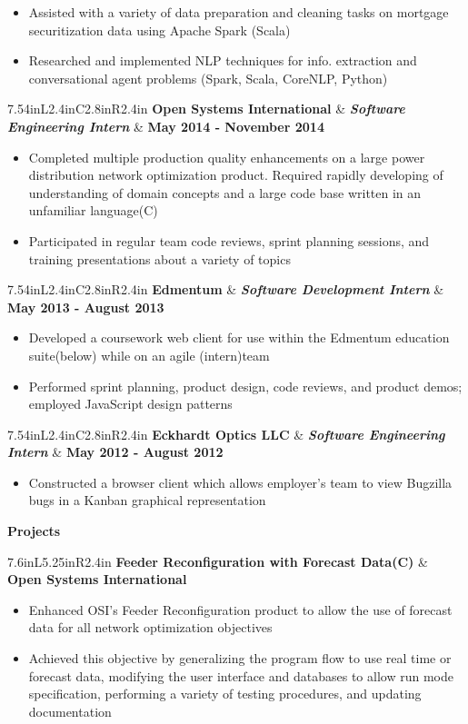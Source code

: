 \documentclass[letterpaper,10pt]{article}
\newcommand{\resitem}[1]{\item #1 

\vspace{-.1in}
}
\newcommand{\resheading}[1]{
	{
		\large\colorbox{mygrey}
		{
			\begin{minipage}{.98\textwidth}

			\centerline{\textbf{#1 \vphantom{p\^{E}}}}
			\end{minipage}
		}
	}
}
\newcommand{\ressubheadingg}[2]{
	\begin{tabular*}{7.6in}{L{5.25in}R{2.4in}}
			\textbf{#1} & \textbf{#2}
	\end{tabular*}
}
\newcommand{\rressubheading}[3]{
	\begin{tabular*}{7.54in}{L{2.4in}C{2.8in}R{2.4in}}
			\textbf{#1} & \textit{\textbf{#2}}  & \textbf{#3}
	\end{tabular*}
}
\begin{document}
			\vspace{-.1in}
			\begin{itemize}
				\resitem{Assisted with a variety of data preparation and cleaning tasks on mortgage securitization data using Apache Spark (Scala)}
				\resitem{Researched and implemented NLP techniques for info. extraction and conversational agent problems (Spark, Scala, CoreNLP, Python)}
			\end{itemize}
			\vspace{.1in}
		\rressubheading{Open Systems International}{Software Engineering Intern}{May 2014 - November 2014}
			\vspace{-.1in}
			\begin{itemize}
				\resitem{Completed multiple production quality enhancements on a large power distribution network optimization product. Required rapidly developing of understanding of domain concepts and a large code base written in an unfamiliar language(C)}
				\resitem{Participated in regular team code reviews, sprint planning sessions, and training presentations about a variety of topics}
			\end{itemize}
			\vspace{.1in}
		\rressubheading{Edmentum}{Software Development Intern}{May 2013 - August 2013}
			\vspace{-.1in}
			\begin{itemize}
				\resitem{Developed a coursework web client for use within the Edmentum education suite(below) while on an agile (intern)team}
				\resitem{Performed sprint planning, product design, code reviews, and product demos; employed JavaScript design patterns}
			\end{itemize}
			\vspace{.1in}
			\rressubheading{Eckhardt Optics LLC}{Software Engineering Intern}{May 2012 - August 2012}
			\vspace{-.1in}
			\begin{itemize}
				\resitem{Constructed a browser client which allows employer's team to view Bugzilla bugs in a Kanban graphical representation}
			\end{itemize}
			\vspace{.1in}
	\resheading{Projects}
		\ressubheadingg{Feeder Reconfiguration with Forecast Data(C)}{Open Systems International}
			\vspace{-.25in}
			\begin{itemize}
				\resitem{Enhanced OSI's Feeder Reconfiguration product to allow the use of forecast data for all network optimization objectives}
				\resitem{Achieved this objective by generalizing the program flow to use real time or forecast data, modifying the user interface and databases to allow run mode specification, performing a variety of testing procedures, and updating documentation}
			\end{itemize}
\end{document}
